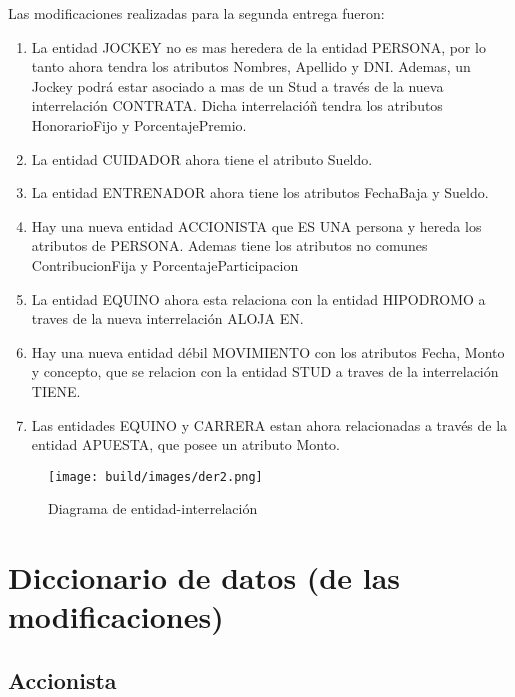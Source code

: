 \documentclass[a4paper,11pt]{article}
\begin{document}
Las modificaciones realizadas para la segunda entrega fueron:
\begin{enumerate}

  \item La entidad JOCKEY no es mas heredera de la entidad PERSONA, por lo tanto
	ahora tendra los atributos Nombres, Apellido y DNI. Ademas, un Jockey podrá
	estar asociado a mas de un Stud a través de la nueva interrelación CONTRATA.
    Dicha interrelacióñ tendra los atributos HonorarioFijo y PorcentajePremio. 

  \item La entidad CUIDADOR ahora tiene el atributo Sueldo.

  \item La entidad ENTRENADOR ahora tiene los atributos FechaBaja y Sueldo. 

  \item Hay una nueva entidad ACCIONISTA que ES UNA persona y hereda los atributos
	de PERSONA. Ademas tiene los atributos no comunes ContribucionFija y 
    PorcentajeParticipacion
  
  \item La entidad EQUINO ahora esta relaciona con la entidad HIPODROMO a traves
    de la nueva interrelación ALOJA EN. 

  \item Hay una nueva entidad débil MOVIMIENTO con los atributos Fecha, Monto y 
    concepto, que se relacion con la entidad STUD a traves de la interrelación
    TIENE.

  \item Las entidades EQUINO y CARRERA estan ahora relacionadas a través de la
    entidad APUESTA, que posee un atributo Monto. 

\end{enumerate}

\begin{figure}[h!t]
  \centering
  \texttt{[image: build/images/der2.png]}
  \caption{Diagrama de entidad-interrelación} \label{fig:der2}
\end{figure}

\FloatBarrier

\section{Diccionario de datos (de las modificaciones)}

\subsection{Accionista}
\end{document}
